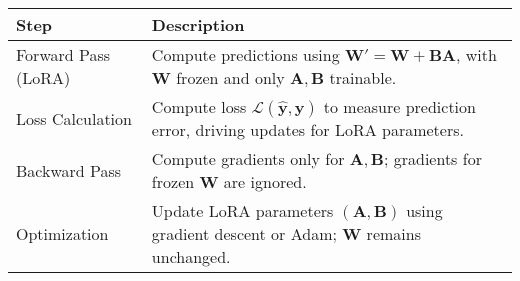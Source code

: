 \documentclass[a4paper, 12pt]{article}
\begin{document}
\begin{center}
\begin{tabular}{|l|p{10cm}|}
\hline
\textbf{Step} & \textbf{Description} \\
\hline
Forward Pass (LoRA) & Compute predictions using $\mathbf{W}' = \mathbf{W} + \mathbf{B}\mathbf{A}$, with $\mathbf{W}$ frozen and only $\mathbf{A}, \mathbf{B}$ trainable. \\
\hline
Loss Calculation & Compute loss $\mathcal{L}(\hat{\mathbf{y}}, \mathbf{y})$ to measure prediction error, driving updates for LoRA parameters. \\
\hline
Backward Pass & Compute gradients only for $\mathbf{A}, \mathbf{B}$; gradients for frozen $\mathbf{W}$ are ignored. \\
\hline
Optimization & Update LoRA parameters $(\mathbf{A}, \mathbf{B})$ using gradient descent or Adam; $\mathbf{W}$ remains unchanged. \\
\hline
\end{tabular}
\end{center}
\end{document}
